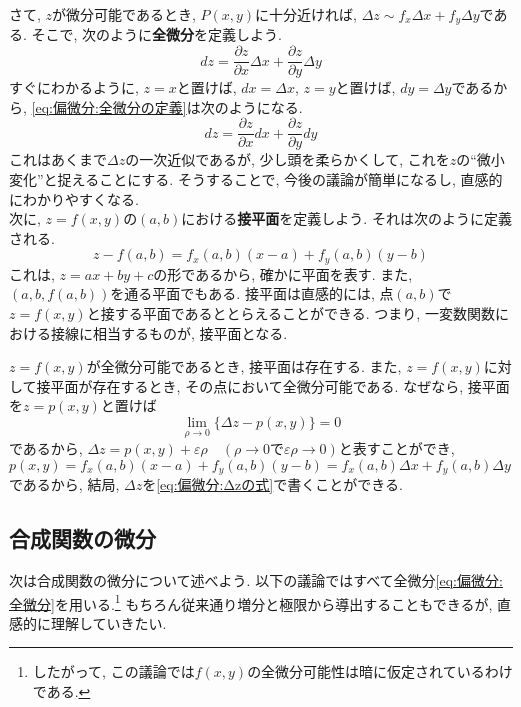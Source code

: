         \clearpage
        さて, $z$が微分可能であるとき, $P(x,y)$に十分近ければ, $\Delta z\sim f_x\Delta x+f_y\Delta y$である. そこで, 次のように\textbf{全微分}を定義しよう.
        \begin{equation}
            dz = \frac{\partial z}{\partial x}\Delta x + \frac{\partial z}{\partial y}\Delta y \label{eq:偏微分:全微分の定義}
        \end{equation}
        すぐにわかるように, $z=x$と置けば, $dx=\Delta x$, $z=y$と置けば, $dy=\Delta y$であるから, \eqref{eq:偏微分:全微分の定義}は次のようになる.
        \begin{equation}
            dz = \frac{\partial z}{\partial x}dx + \frac{\partial z}{\partial y}dy \label{eq:偏微分:全微分}
        \end{equation}
        これはあくまで$\Delta z$の一次近似であるが, 少し頭を柔らかくして, これを$z$の``微小変化''と捉えることにする. そうすることで, 今後の議論が簡単になるし, 直感的にわかりやすくなる.\\

        次に, $z=f(x,y)$の$(a,b)$における\textbf{接平面}を定義しよう. それは次のように定義される.
        \begin{equation}
            z-f(a,b)=f_{x}(a,b) (x-a) + f_{y}(a,b) (y-b) \label{eq:偏微分:接平面の定義}
        \end{equation}
        これは, $z=ax+by+c$の形であるから, 確かに平面を表す. また, $(a,b,f(a,b))$を通る平面でもある. 接平面は直感的には, 点$(a,b)$で$z=f(x,y)$と接する平面であるととらえることができる.
        つまり, 一変数関数における接線に相当するものが, 接平面となる. 

        $z=f(x,y)$が全微分可能であるとき, 接平面は存在する. また, $z=f(x,y)$に対して接平面が存在するとき, その点において全微分可能である. なぜなら, 接平面を$z=p(x,y)$と置けば
        \begin{equation*}
            \lim_{\rho \to 0}\{\Delta z - p(x,y)\} = 0
        \end{equation*}
        であるから, $\Delta z = p(x,y)+\varepsilon\rho\quad (\rho\to 0で\varepsilon\rho\to 0)$と表すことができ, $p(x,y)=f_{x}(a,b)(x-a)+f_{y}(a,b)(y-b)=f_{x}(a,b)\Delta x+f_{y}(a,b)\Delta y$であるから, 
        結局, $\Delta z$を\eqref{eq:偏微分:Δzの式}で書くことができる. 
    \clearpage
    \subsection{合成関数の微分}
        次は合成関数の微分について述べよう. 以下の議論ではすべて全微分\eqref{eq:偏微分:全微分}を用いる.\footnote{したがって, この議論では$f(x,y)$の全微分可能性は暗に仮定されているわけである.} もちろん従来通り増分と極限から導出することもできるが, 直感的に理解していきたい.


